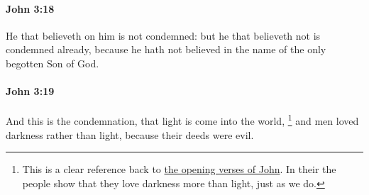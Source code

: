 		\paragraph{John 3:18} %
			\label{JOHN-3-18}

			He that believeth on him is not condemned: but he that believeth not is condemned already, because he hath not believed in the name of the only begotten Son of God.

			\begin{framed}
			\scriptsize
				\begin{compactdesc}
					\item[SBLG]  \hyperref[KRINO]{} \hyperref[KRINO]{}
				\end{compactdesc}
			\end{framed}

		\paragraph{John 3:19} %
			\label{JOHN-3-19}

			And this is the condemnation, that light is come into the world,%
				\footnote{%
					This is a clear reference back to \hyperref[JOHN-1-1]{the opening verses of John}. In their  the people show that they love darkness more than light, just as we do.
					}
			and men loved darkness rather than light, because their deeds were evil.

